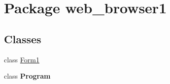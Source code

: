 \hypertarget{namespaceweb__browser1}{\section{Package web\+\_\+browser1}
\label{namespaceweb__browser1}
}
\subsection*{Classes}
\begin{DoxyCompactItemize}
\item 
class \hyperlink{classweb__browser1_1_1_form1}{Form1}
\item 
class {\bfseries Program}
\end{DoxyCompactItemize}
